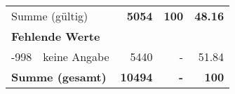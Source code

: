 \begin{longtable}{lXrrr}
     \midrule
     \multicolumn{2}{l}{Summe (gültig)} &
       \textbf{\num{5054}} &
     \textbf{\num{100}} &
       \textbf{\num[round-mode=places,round-precision=2]{48.16}} \\
     \multicolumn{5}{l}{\textbf{Fehlende Werte}}\\
       -998 &
       keine Angabe &
         \num{5440} &
        - &
         \num[round-mode=places,round-precision=2]{51.84} \\
     \midrule
     \multicolumn{2}{l}{\textbf{Summe (gesamt)}} &
          \textbf{\num{10494}} &
        \textbf{-} &
        \textbf{\num{100}} \\
     \bottomrule
     \end{longtable}
     
